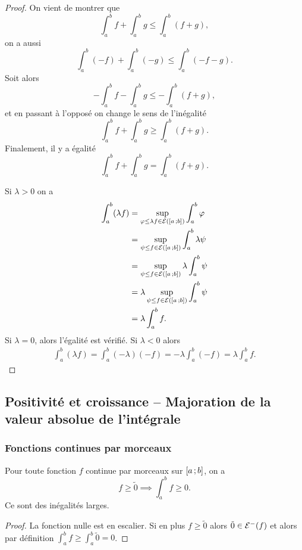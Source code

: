 \begin{proof}
On vient de montrer que
\begin{equation}
  \int_a^b f + \int_a^b g \leq \int_a^b (f+g),
\end{equation}
on a aussi
\begin{equation}
  \int_a^b (-f) + \int_a^b (-g) \leq \int_a^b (-f-g).
\end{equation}
Soit alors
\begin{equation}
  -\int_a^b f - \int_a^b g \leq -\int_a^b (f+g),
\end{equation}
et en passant à l'opposé on change le sens de l'inégalité
\begin{equation}
  \int_a^b f + \int_a^b g \geq \int_a^b (f+g).
\end{equation}
Finalement, il y a égalité 
\begin{equation}
  \int_a^b f + \int_a^b g = \int_a^b (f+g).
\end{equation}

Si $\lambda>0$ on a
\begin{align}
  \int_a^b (\lambda f) &= \sup\limits_{\varphi \leq \lambda f \in \mathcal{E}(\left[ a \, ;  b \right])} \int_a^b \varphi \\
  &= \sup\limits_{\psi \leq f \in \mathcal{E}(\left[ a \, ;  b \right])} \int_a^b \lambda \psi \\
  &= \sup\limits_{\psi \leq f \in \mathcal{E}(\left[ a \, ;  b \right])} \lambda \int_a^b \psi \\
  &= \lambda \sup\limits_{\psi \leq f \in \mathcal{E}(\left[ a \, ;  b \right])} \int_a^b \psi \\
  &=\lambda \int_a^b f.
\end{align}
Si $\lambda=0$, alors l'égalité est vérifié. Si $\lambda<0$ alors
\begin{align}
  \int_a^b (\lambda f) = \int_a^b (-\lambda)(-f) = -\lambda \int_a^b(-f) = \lambda \int_a^b f.
\end{align}
\end{proof}

\subsection{Positivité et croissance -- Majoration de la valeur absolue de l'intégrale}

\subsubsection{Fonctions continues par morceaux}

\begin{theo}
  Pour toute fonction $f$ continue par morceaux sur $\left[ a \, ;  b \right]$, on a
  \begin{equation}
    f \geq \tilde{0} \implies \int_a^b f \geq 0.
  \end{equation}
  \danger Ce sont des inégalités larges.
\end{theo}
\begin{proof}
  La fonction nulle est en escalier. Si en plus $f \geq \tilde{0}$ alors $\tilde{0} \in \mathcal{E}^{-}(f)$ et alors par définition $\int_a^b f \geq \int_a^b \tilde{0}=0$.
\end{proof}

